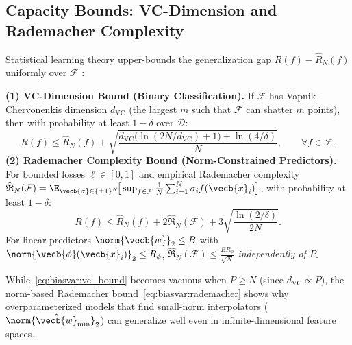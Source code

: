 \documentclass[../../../../master.tex]{subfiles}
\begin{document}
\subsection{Capacity Bounds: VC-Dimension and Rademacher Complexity}

Statistical learning theory upper-bounds the generalization gap $R(f) - \hat{R}_N(f)$ uniformly over $\mathcal{F}$ :

\begin{coremath}
\label{thm:biasvar:capacity}
\textbf{(1) VC-Dimension Bound (Binary Classification).}
If $\mathcal{F}$ has Vapnik--Chervonenkis dimension $d_{\mathrm{VC}}$ (the largest $m$ such that $\mathcal{F}$ can shatter $m$ points), then with probability at least $1 - \delta$ over $\mathcal{D}$:
\begin{equation}
  R(f) \le \hat{R}_N(f) + \sqrt{\frac{d_{\mathrm{VC}}\big(\ln(2N/d_{\mathrm{VC}}) + 1\big) + \ln(4/\delta)}{N}},
  \qquad \forall f \in \mathcal{F}.
  \label{eq:biasvar:vc_bound}
\end{equation}
\textbf{(2) Rademacher Complexity Bound (Norm-Constrained Predictors).}
For bounded losses $\ell \in [0, 1]$ and empirical Rademacher complexity $\hat{\mathfrak{R}}_N(\mathcal{F}) = \E_{\vecb{\sigma} \in \{\pm 1\}^N}\!\big[\sup_{f \in \mathcal{F}} \frac{1}{N}\sum_{i=1}^N \sigma_i f(\vecb{x}_i)\big]$, with probability at least $1 - \delta$:
\begin{equation}
  R(f) \le \hat{R}_N(f) + 2\hat{\mathfrak{R}}_N(\mathcal{F}) + 3\sqrt{\frac{\ln(2/\delta)}{2N}}.
  \label{eq:biasvar:rademacher}
\end{equation}
For linear predictors $\norm{\vecb{w}}_2 \le B$ with $\norm{\vecb{\phi}(\vecb{x}_i)}_2 \le R_\phi$, $\hat{\mathfrak{R}}_N(\mathcal{F}) \le \frac{B R_\phi}{\sqrt{N}}$ \emph{independently of $P$}.
\end{coremath}

While~\eqref{eq:biasvar:vc_bound} becomes vacuous when $P \ge N$ (since $d_{\mathrm{VC}} \propto P$), the norm-based Rademacher bound~\eqref{eq:biasvar:rademacher} shows why overparameterized models that find small-norm interpolators ($\norm{\hat{\vecb{w}}_{\mathrm{min}}}_2$) can generalize well even in infinite-dimensional feature spaces.
\end{document}
